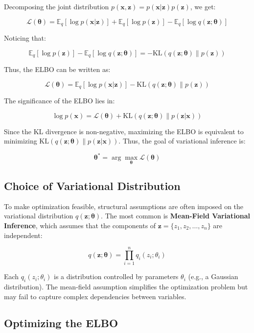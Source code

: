 \documentclass[10pt]{elegantbook}
\begin{document}
Decomposing the joint distribution \( p(\mathbf{x}, \mathbf{z}) = p(\mathbf{x} | \mathbf{z}) p(\mathbf{z}) \), we get:

\[
\mathcal{L}(\boldsymbol{\theta}) = \mathbb{E}_q [\log p(\mathbf{x} | \mathbf{z})] + \mathbb{E}_q [\log p(\mathbf{z})] - \mathbb{E}_q [\log q(\mathbf{z}; \boldsymbol{\theta})]
\]

Noticing that:

\[
\mathbb{E}_q [\log p(\mathbf{z})] - \mathbb{E}_q [\log q(\mathbf{z}; \boldsymbol{\theta})] = -\text{KL}(q(\mathbf{z}; \boldsymbol{\theta}) \| p(\mathbf{z}))
\]

Thus, the ELBO can be written as:

\[
\mathcal{L}(\boldsymbol{\theta}) = \mathbb{E}_q [\log p(\mathbf{x} | \mathbf{z})] - \text{KL}(q(\mathbf{z}; \boldsymbol{\theta}) \| p(\mathbf{z}))
\]

The significance of the ELBO lies in:

\[
\log p(\mathbf{x}) = \mathcal{L}(\boldsymbol{\theta}) + \text{KL}(q(\mathbf{z}; \boldsymbol{\theta}) \| p(\mathbf{z} | \mathbf{x}))
\]

Since the KL divergence is non-negative, maximizing the ELBO is equivalent to minimizing \( \text{KL}(q(\mathbf{z}; \boldsymbol{\theta}) \| p(\mathbf{z} | \mathbf{x})) \). Thus, the goal of variational inference is:

\[
\boldsymbol{\theta}^* = \arg\max_{\boldsymbol{\theta}} \mathcal{L}(\boldsymbol{\theta})
\]

\subsection{Choice of Variational Distribution}

To make optimization feasible, structural assumptions are often imposed on the variational distribution \( q(\mathbf{z}; \boldsymbol{\theta}) \). The most common is \textbf{Mean-Field Variational Inference}, which assumes that the components of \( \mathbf{z} = \{z_1, z_2, \dots, z_n\} \) are independent:

\[
q(\mathbf{z}; \boldsymbol{\theta}) = \prod_{i=1}^n q_i(z_i; \theta_i)
\]

Each \( q_i(z_i; \theta_i) \) is a distribution controlled by parameters \( \theta_i \) (e.g., a Gaussian distribution). The mean-field assumption simplifies the optimization problem but may fail to capture complex dependencies between variables.

\subsection{Optimizing the ELBO}
\end{document}
